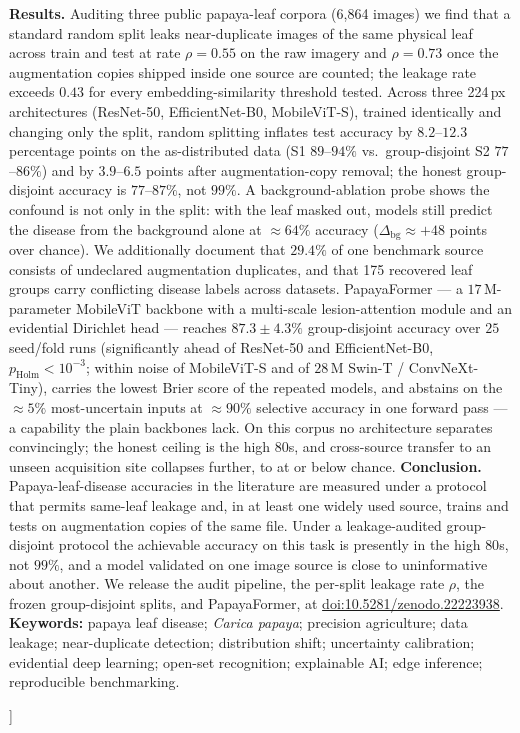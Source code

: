 \documentclass[10pt,twocolumn,a4paper]{article}
\begin{document}
\begin{@twocolumnfalse}
\begin{center}
{{\textbf{Results.} Auditing three public papaya-leaf corpora (6{,}864 images) we find that a standard random split leaks near-duplicate images of the same physical leaf across train and test at rate $\rho=0.55$ on the raw imagery and $\rho=0.73$ once the augmentation copies shipped inside one source are counted; the leakage rate exceeds $0.43$ for every embedding-similarity threshold tested. Across three 224\,px architectures (ResNet-50, EfficientNet-B0, MobileViT-S), trained identically and changing only the split, random splitting inflates test accuracy by $8.2$--$12.3$ percentage points on the as-distributed data (S1 $89$--$94\%$ vs.\ group-disjoint S2 $77$--$86\%$) and by $3.9$--$6.5$ points after augmentation-copy removal; the honest group-disjoint accuracy is $77$--$87\%$, not $99\%$. A background-ablation probe shows the confound is not only in the split: with the leaf masked out, models still predict the disease from the background alone at $\approx64\%$ accuracy ($\Delta_{\text{bg}}\approx+48$ points over chance). We additionally document that $29.4\%$ of one benchmark source consists of undeclared augmentation duplicates, and that 175 recovered leaf groups carry conflicting disease labels across datasets. PapayaFormer --- a $17$\,M-parameter MobileViT backbone with a multi-scale lesion-attention module and an evidential Dirichlet head --- reaches $87.3 \pm 4.3\%$ group-disjoint accuracy over $25$ seed/fold runs (significantly ahead of ResNet-50 and EfficientNet-B0, $p_{\text{Holm}}<10^{-3}$; within noise of MobileViT-S and of $28$\,M Swin-T / ConvNeXt-Tiny), carries the lowest Brier score of the repeated models, and abstains on the $\approx5\%$ most-uncertain inputs at $\approx90\%$ selective accuracy in one forward pass --- a capability the plain backbones lack. On this corpus no architecture separates convincingly; the honest ceiling is the high $80$s, and cross-source transfer to an unseen acquisition site collapses further, to at or below chance.
\textbf{Conclusion.} Papaya-leaf-disease accuracies in the literature are measured under a protocol that permits same-leaf leakage and, in at least one widely used source, trains and tests on augmentation copies of the same file. Under a leakage-audited group-disjoint protocol the achievable accuracy on this task is presently in the high $80$s, not $99\%$, and a model validated on one image source is close to uninformative about another. We release the audit pipeline, the per-split leakage rate $\rho$, the frozen group-disjoint splits, and PapayaFormer, at \href{https://doi.org/10.5281/zenodo.22223938}{doi:10.5281/zenodo.22223938}.
\\[4pt]
\textbf{Keywords:} papaya leaf disease; \textit{Carica papaya}; precision agriculture; data leakage; near-duplicate detection; distribution shift; uncertainty calibration; evidential deep learning; open-set recognition; explainable AI; edge inference; reproducible benchmarking.
}}
\vspace{10pt}
\end{center}
\end{@twocolumnfalse}
]
\end{document}
